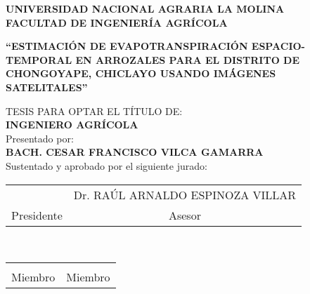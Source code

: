 \begin{center}
\thispagestyle{empty}
 {\fontsize{18pt}{ \baselineskip}\selectfont \textbf{UNIVERSIDAD NACIONAL AGRARIA LA MOLINA}}\\[0.5cm]
 {\fontsize{16pt}{ \baselineskip}\selectfont \textbf{FACULTAD DE INGENIERÍA AGRÍCOLA}}\\[1cm]
 
 {\fontsize{12pt}{10pt}\selectfont \textbf{``ESTIMACIÓN DE EVAPOTRANSPIRACIÓN ESPACIO-TEMPORAL EN ARROZALES PARA EL DISTRITO DE CHONGOYAPE, CHICLAYO USANDO IMÁGENES SATELITALES''}\par}
 
 \vspace{1cm}
 
 {\fontsize{12pt}{ \baselineskip}\selectfont TESIS PARA OPTAR EL TÍTULO  DE:}\\
 {\fontsize{14pt}{ \baselineskip}\selectfont\textbf{INGENIERO AGRÍCOLA}}\\[1cm]
 
 {\fontsize{12pt}{ \baselineskip}\selectfont Presentado por:} \\
 {\fontsize{14pt}{ \baselineskip}\selectfont \textbf{BACH. CESAR FRANCISCO VILCA GAMARRA}}\\
 {\fontsize{12pt}{ \baselineskip}\selectfont Sustentado y aprobado por el siguiente jurado:}\\[3cm]
 
\begin{minipage}{\linewidth}

\centering
\singlespacing

\begin{tabular}{cc}
    {\fontsize{10pt}{ \baselineskip}\selectfont{Dr. VÍCTOR LEVINGSTON PEÑA GUILLÉN}} \hspace{0.75cm} & \hspace{0.75cm}
    {\fontsize{10pt}{ \baselineskip}\selectfont Dr. RAÚL ARNALDO ESPINOZA VILLAR} \\
 
    \small{Presidente} \hspace{0.75cm} &  \hspace{0.75cm} \small{Asesor}
\end{tabular}\\[3cm]

\begin{tabular}{cc}
    {\fontsize{10pt}{ \baselineskip}\selectfont{Arq. TAÍCIA HELENA NEGRIN MARQUES}} \hspace{0.75cm} &  \hspace{0.75cm} 
    {\fontsize{10pt}{ \baselineskip}\selectfont{Mestre JORGE LUIS DÍAZ RIMARACHIN}} \\
    \small{Miembro} \hspace{0.75cm} &  \hspace{0.75cm} \small{Miembro}  
\end{tabular}\\[1cm]


\end{minipage}
\end{center}
